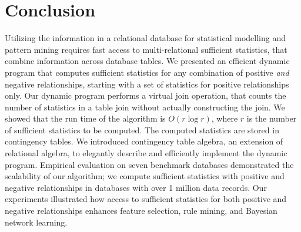 \documentclass{sig-alternate-2013}
\begin{document}
%



\section{Conclusion} \label{sec:conclusion} 
Utilizing the information in a relational database for statistical modelling and pattern mining requires fast access to multi-relational sufficient statistics, that combine information across database tables. 
We presented an efficient dynamic program that computes sufficient statistics for any combination of positive {\em and} negative relationships, starting with a set of statistics for positive relationships only.
Our dynamic program performs a virtual join operation, that counts the number of statistics in a table join without actually constructing the join. We showed that the run time of the algorithm is $O(r \log r)$, where $r$ is the number of sufficient statistics to be computed.
The computed statistics are stored in contingency tables.
We introduced contingency table algebra, an extension of relational algebra, to elegantly describe and efficiently implement the dynamic program. 
Empirical evaluation on seven benchmark databases demonstrated the scalability of our algorithm; we compute sufficient statistics with positive and negative relationships in databases with over 1 million data records.  
Our experiments illustrated how access to sufficient statistics for both positive and negative relationships enhances feature selection, rule mining, and Bayesian network learning.  
\end{document}

